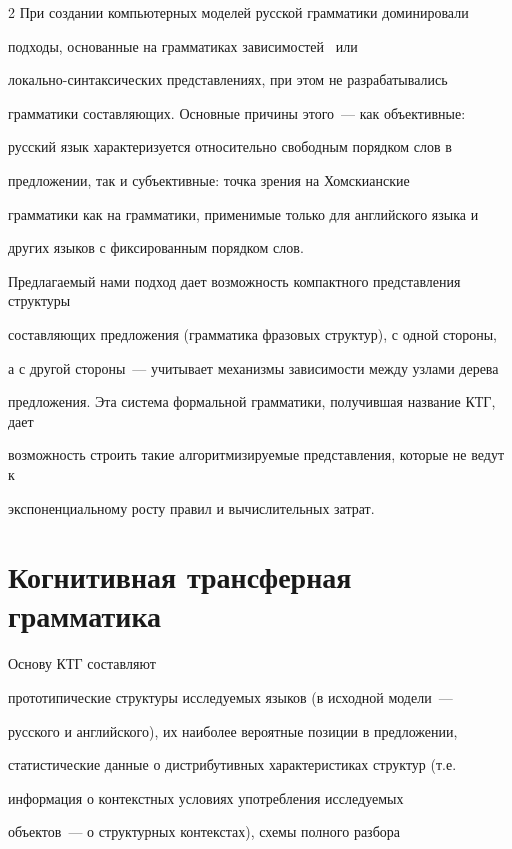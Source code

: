 \begin{multicols}{2}
При создании компьютерных моделей русской грамматики доминировали


подходы, основанные на грамматиках зависимостей~\cite{9koz}  или


локально-синтаксических представлениях, при этом не разрабатывались


грамматики составляющих. Основные причины этого~--- как объективные:


русский язык характеризуется относительно свободным порядком слов в


предложении, так и субъективные:  точка зрения на Хомскианские


грамматики как на грамматики, применимые только для английского языка и


других языков с фиксированным порядком слов.





Предлагаемый нами подход дает возможность компактного представления структуры 


со\-став\-ля\-ющих предложения (грамматика фразовых структур), с одной стороны, 


а с другой стороны~--- учитывает механизмы зависимости между узлами дерева 


предложения. Эта система формальной грамматики, получившая название КТГ, дает 


возможность строить такие алгоритмизируемые представления, которые не ведут к 


экспоненциальному росту правил и вычислительных затрат.





\section{Когнитивная трансферная грамматика}





Основу КТГ составляют


прототипические структуры исследуемых языков (в исходной модели~---


русского и английского), их наиболее вероятные позиции в предложении,


статистические данные о дистрибутивных характеристиках структур (т.е.\


информация о контекстных условиях употребления ис\-сле\-ду\-емых


объектов~---  о структурных контекстах), схемы полного разбора



\end{multicols}
